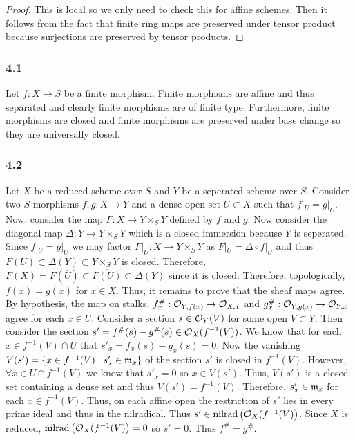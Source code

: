 \documentclass[12pt]{article}
\begin{document}
\begin{proof}
This is local so we only need to check this for affine schemes. Then it follows from the fact that finite ring maps are preserved under tensor product because surjections are preserved by tensor products.
\end{proof}

\subsubsection{4.1}

Let $f : X \to S$ be a finite morphism. Finite morphisms are affine and thus separated and clearly finite morphisms are of finite type. Furthermore, finite morphisms are closed and finite morphisms are preserved under base change so they are universally closed.  

\subsubsection{4.2}

Let $X$ be a reduced scheme over $S$ and $Y$ be a seperated scheme over $S$. Consider two $S$-morphisms $f,g : X \to Y$ and a dense open set $U \subset X$ such that $f|_U = g|_U$. Now, consider the map $F : X \to Y \times_S Y$ defined by $f$ and $g$. Now consider the diagonal map $\Delta : Y \to Y \times_S Y$ which is a closed immersion because $Y$ is seperated. Since $f|_U = g|_U$ we may factor $F |_U : X \to Y \times_S Y$ as $F|_U = \Delta \circ f|_U$ and thus $F(U) \subset \Delta(Y) \subset Y \times_S Y$ is closed. Therefore, $F(X) = F(\overline{U}) \subset \overline{F(U)} \subset \Delta(Y)$ since it is closed. Therefore, topologically, $f(x) = g(x)$ for $x \in X$. Thus, it remains to prove that the sheaf maps agree. By hypothesis, the map on stalks, $f^\#_x : \mathcal{O}_{Y, f(x)} \to \mathcal{O}_{X, x}$ and $g^\#_x : \mathcal{O}_{Y, g(x)} \to \mathcal{O}_{Y, x}$ agree for each $x \in U$. Consider a section $s \in \mathcal{O}_{Y}(V)$ for some open $V \subset Y$. Then consider the section $s' = f^\#(s) - g^\#(s) \in \mathcal{O}_{X}(f^{-1}(V))$. We know that for each $x \in f^{-1}(V) \cap U$ that $s'_x = f_x(s) - g_x(s) = 0$. Now the vanishing $V(s') = \{ x \in f^{-1}(V) \mid s'_x \in \mathfrak{m}_x \}$ of the section $s'$ is closed in $f^{-1}(V)$. However, $\forall x \in U \cap f^{-1}(V)$ we know that $s'_x = 0$ so $x \in V(s')$. Thus, $V(s')$ is a closed set containing a dense set and thus $V(s') = f^{-1}(V)$. Therefore, $s'_x \in \mathfrak{m}_x$ for each $x \in f^{-1}(V)$. Thus, on each affine open the restriction of $s'$ lies in every prime ideal and thus in the nilradical. Thus $s' \in \mathrm{nilrad}\left( \mathcal{O}_{X}(f^{-1}(V) \right)$. Since $X$ is reduced, $\mathrm{nilrad}\left( \mathcal{O}_{X}(f^{-1}(V) \right) = 0$ so $s' = 0$. Thus $f^\# = g^\#$. 
\end{document}
